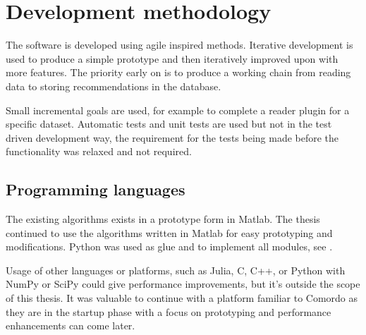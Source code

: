 \section{Development methodology}

The software is developed using agile inspired methods. Iterative development is used to produce a simple prototype and then iteratively improved upon with more features.  The priority early on is to produce a working chain from reading data to storing recommendations in the database.

Small incremental goals are used, for example to complete a reader plugin for a specific dataset.  Automatic tests and unit tests are used but not in the test driven development way, the requirement for the tests being made before the functionality was relaxed and not required.


\subsection{Programming languages}

The existing algorithms exists in a prototype form in Matlab. The thesis continued to use the algorithms written in Matlab for easy prototyping and modifications. Python was used as glue and to implement all modules, see .

Usage of other languages or platforms, such as Julia, C, C++, or Python with NumPy or SciPy could give performance improvements, but it's outside the scope of this thesis.  It was valuable to continue with a platform familiar to Comordo as they are in the startup phase with a focus on prototyping and performance enhancements can come later.


